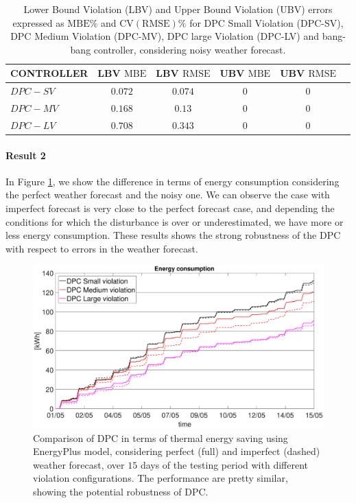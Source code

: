 \begin{table}[t!]
	\centering
	\textcolor[rgb]{0,0,1}{\begin{tabular}{lccccc}
		\toprule
		CONTROLLER  & LBV $\mathrm{MBE}$  & LBV $\mathrm{RMSE}$ & UBV $\mathrm{MBE}$ & UBV $\mathrm{RMSE}$ 	\\ 
		\midrule
		$DPC-SV$    & $0.072$             & $0.074$  			      & $0$    				 & $0$     	  	\\
		$DPC-MV$    & $0.168$ 			  & $0.13$       			  & $0$    				 & $0$		  	\\
		$DPC-LV$    & $0.708$  			  & $0.343$     			  & $0$    				 & $0$	      	\\
		\bottomrule
	\end{tabular}}
	\caption{\textcolor[rgb]{0,0,1}{Lower Bound Violation (LBV) and Upper Bound Violation (UBV) errors expressed as $\mathrm{MBE}\%$ and $\mathrm{CV(RMSE)}\%$ for DPC Small Violation (DPC-SV), DPC Medium Violation (DPC-MV), DPC large Violation (DPC-LV) and bang-bang controller, considering noisy weather forecast.}}
	\captionsetup{justification=centering}
	\label{T:violationErrorsNoisy}
\end{table}


\textcolor[rgb]{0,0,1}{\paragraph{Result 2} 
In Figure \ref{F:comparison_all_energy_E+_noisy}, we show the difference in terms of energy consumption considering the perfect weather forecast and the noisy one.
We can observe the case with imperfect forecast is very close to the perfect forecast case, and depending the conditions for which the disturbance is over or underestimated, we have more or less energy consumption. These results shows the strong robustness of the DPC with respect to errors in the weather forecast.}
\begin{figure}[t!]
	\begin{center}
		\includegraphics[width=28pc]{figures/Energy_all_EnergyPlus_noisy.eps}
	\end{center}
	\caption{\textcolor[rgb]{0,0,1}{Comparison of DPC in terms of thermal energy saving using EnergyPlus model, considering perfect (full) and imperfect (dashed) weather forecast, over $15$ days of the testing period with different violation configurations. The performance are pretty similar, showing the potential robustness of DPC.}}
	\label{F:comparison_all_energy_E+_noisy}
\end{figure}
